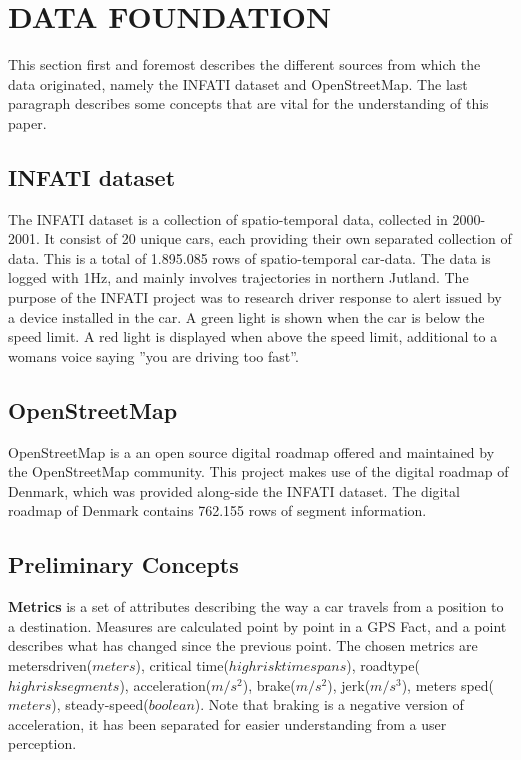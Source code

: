 \section{DATA FOUNDATION}\label{sec:datafound}

This section first and foremost describes the different sources from which the data originated, namely the INFATI dataset and OpenStreetMap. The last paragraph describes some concepts that are vital for the understanding of this paper. 

\subsection{INFATI dataset}
The INFATI dataset\cite{art:INFATI} is a collection of spatio-temporal data, collected in 2000-2001. It consist of 20 unique cars, each providing their own separated collection of data. This is a total of 1.895.085 rows of spatio-temporal car-data. The data is logged with 1Hz, and mainly involves trajectories in northern Jutland. The purpose of the INFATI\cite{art:INFATI} project was to research driver response to alert issued by a device installed in the car. A green light is shown when the car is below the speed limit. A red light is displayed when above the speed limit, additional to a womans voice saying ''you are driving too fast''.

\subsection{OpenStreetMap}
OpenStreetMap\cite{osm} is a an open source digital roadmap offered  and maintained by the OpenStreetMap community. This project makes use of the digital roadmap of Denmark, which was provided along-side the INFATI dataset\cite{art:INFATI}. The digital roadmap of Denmark contains 762.155 rows of segment information.

\subsection{Preliminary Concepts}\label{subsec:precon}
\textbf{Metrics} is a set of attributes describing the way a car travels from a position  to a destination. Measures are calculated point by point in a GPS Fact, and a point describes what has changed since the previous point. The chosen metrics are metersdriven($meters$), critical time($high risk timespans$), roadtype($high risk segments$), acceleration($m/s^2$), brake($m/s^2$), jerk($m/s^3$), meters sped($meters$), steady-speed($boolean$). Note that braking is a negative version of acceleration, it has been separated for easier understanding from a user perception.

